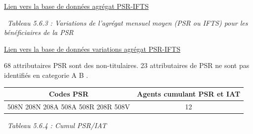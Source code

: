 \href{../Bases/Remunerations/beneficiaires.PSR.IFTS.csv}{Lien vers la base
de données agrégat PSR-IFTS}

~\emph{Tableau 5.6.3 : Variations de l'agrégat mensuel moyen (PSR ou
IFTS) pour les bénéficiaires de la PSR}

\href{../Bases/Remunerations/beneficiaires.PSR.IFTS.Variation.csv}{Lien
vers la base de données variations agrégat PSR-IFTS}

68 attributaires PSR sont des non-titulaires. 23 attributaires de PSR ne
sont pas identifiés en categorie A B .

\begin{longtable}[]{@{}cc@{}}
\toprule
Codes PSR & Agents cumulant PSR et IAT\tabularnewline
\midrule
\endhead
508N 208N 208A 508A 508R 208R 508V & 12\tabularnewline
\bottomrule
\end{longtable}

~\emph{Tableau 5.6.4 : Cumul PSR/IAT}

